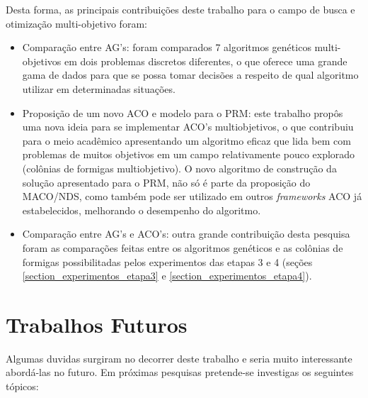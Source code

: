 Desta forma, as principais contribuições deste trabalho para o campo de busca e otimização multi-objetivo foram:

\begin{itemize}
	\item Comparação entre AG's: foram comparados 7 algoritmos genéticos multi-objetivos em dois problemas discretos diferentes, o que oferece uma grande gama de dados para que se possa tomar decisões a respeito de qual algoritmo utilizar em determinadas situações.
	\item Proposição de um novo ACO e modelo para o PRM: este trabalho propôs uma nova ideia para se implementar ACO's multiobjetivos, o que contribuiu para o meio acadêmico apresentando um algoritmo eficaz que lida bem com problemas de muitos objetivos em um campo relativamente pouco explorado (colônias de formigas multiobjetivo). O novo algoritmo de construção da solução apresentado para o PRM, não só é parte da proposição do MACO/NDS, como também pode ser utilizado em outros \textit{frameworks} ACO já estabelecidos, melhorando o desempenho do algoritmo.
	\item Comparação entre AG's e ACO's: outra grande contribuição desta pesquisa foram as comparações feitas entre os algoritmos genéticos e as colônias de formigas possibilitadas pelos experimentos das etapas 3 e 4 (seções \ref{section_experimentos_etapa3} e \ref{section_experimentos_etapa4}).
\end{itemize}

\section{Trabalhos Futuros}
Algumas duvidas surgiram no decorrer deste trabalho e seria muito interessante abordá-las no futuro. Em próximas pesquisas pretende-se investigas os seguintes tópicos:

